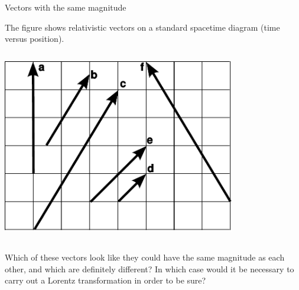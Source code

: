 \begin{frame}{Vectors with the same magnitude}

\dq
The figure shows relativistic vectors on a standard spacetime diagram (time versus position).

  \begin{mycolumns}

    \begin{column}{.4\textwidth}\includegraphics[width=4in]{ch04/figs/congruent-four-vectors}\end{column}

    \begin{column}{.6\textwidth}

Which of these vectors look like they could have the same magnitude as each other, and
which are definitely different? In which case would it be necessary to carry out a Lorentz
transformation in order to be sure?


    \end{column}
  \end{mycolumns}


\end{frame}

